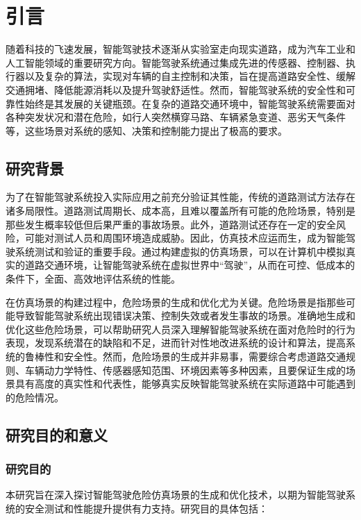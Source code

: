 \chapter{引言}

随着科技的飞速发展，智能驾驶技术逐渐从实验室走向现实道路，成为汽车工业和人工智能领域的重要研究方向。智能驾驶系统通过集成先进的传感器、控制器、执行器以及复杂的算法，实现对车辆的自主控制和决策，旨在提高道路安全性、缓解交通拥堵、降低能源消耗以及提升驾驶舒适性。然而，智能驾驶系统的安全性和可靠性始终是其发展的关键瓶颈。在复杂的道路交通环境中，智能驾驶系统需要面对各种突发状况和潜在危险，如行人突然横穿马路、车辆紧急变道、恶劣天气条件等，这些场景对系统的感知、决策和控制能力提出了极高的要求。

\section{研究背景}


为了在智能驾驶系统投入实际应用之前充分验证其性能，传统的道路测试方法存在诸多局限性。道路测试周期长、成本高，且难以覆盖所有可能的危险场景，特别是那些发生概率较低但后果严重的事故场景。此外，道路测试还存在一定的安全风险，可能对测试人员和周围环境造成威胁。因此，仿真技术应运而生，成为智能驾驶系统测试和验证的重要手段。通过构建虚拟的仿真场景，可以在计算机中模拟真实的道路交通环境，让智能驾驶系统在虚拟世界中“驾驶”，从而在可控、低成本的条件下，全面、高效地评估系统的性能。

在仿真场景的构建过程中，危险场景的生成和优化尤为关键。危险场景是指那些可能导致智能驾驶系统出现错误决策、控制失效或者发生事故的场景。准确地生成和优化这些危险场景，可以帮助研究人员深入理解智能驾驶系统在面对危险时的行为表现，发现系统潜在的缺陷和不足，进而针对性地改进系统的设计和算法，提高系统的鲁棒性和安全性。然而，危险场景的生成并非易事，需要综合考虑道路交通规则、车辆动力学特性、传感器感知范围、环境因素等多种因素，且要保证生成的场景具有高度的真实性和代表性，能够真实反映智能驾驶系统在实际道路中可能遇到的危险情况。



\section{研究目的和意义}

\subsection{研究目的}
本研究旨在深入探讨智能驾驶危险仿真场景的生成和优化技术，以期为智能驾驶系统的安全测试和性能提升提供有力支持。研究目的具体包括：

